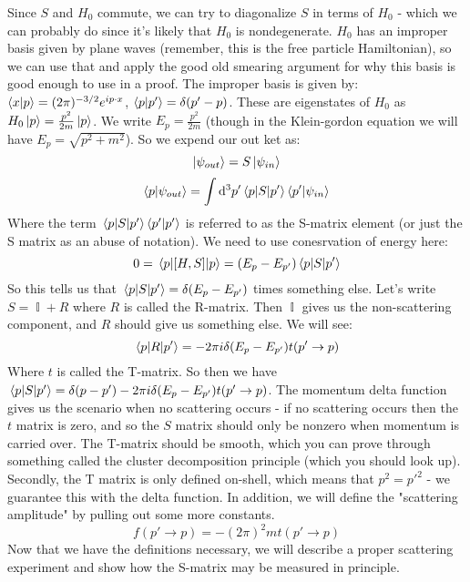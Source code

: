 \documentclass{article}
\DeclareMathOperator{\II}{\mathbb{I}}
\begin{document}
Since $S$ and $H_0$ commute, we can try to diagonalize $S$ in terms of $H_0$ - which we can probably do since it's likely that $H_0$ is nondegenerate. $H_0$ has an improper basis given by plane waves (remember, this is the free particle Hamiltonian), so we can use that and apply the good old smearing argument for why this basis is good enough to use in a proof. The improper basis is given by: $\braket{x}{p} = (2\pi)^{-3/2}e^{ip\cdot x}$, $\braket{p}{p'} = \delta(p'-p)$. These are eigenstates of $H_0$ as $H_0\ket{p}=\frac{p^2}{2m}\ket{p}$. We write $E_p = \frac{p^2}{2m}$ (though in the Klein-gordon equation we will have $E_p=\sqrt{p^2+m^2}$). So we expend our out ket as:
\[\ket{\psi_{out}} = S\ket{\psi_{in}}\]
\begin{equation}\label{scatter1}\braket{p}{\psi_{out}} = \int \dd^3 p' \mel{p}{S}{p'}\braket{p'}{\psi_{in}}\end{equation}
Where the term $ \mel{p}{S}{p'}\braket{p'}$ is referred to as the S-matrix element (or just the S matrix as an abuse of notation). We need to use conesrvation of energy here:
\[0 = \mel{p}{[H,S]}{p} = (E_{p}-E_{p'})\mel{p}{S}{p'}\]
So this tells us that $\mel{p}{S}{p'}=\delta(E_p-E_{p'})$ times something else. Let's write $S = \II + R$ where $R$ is called the R-matrix. Then $\II$ gives us the non-scattering component, and $R$ should give us something else. We will see:
\begin{equation}\label{scatter2}\mel{p}{R}{p'}=-2\pi i \delta(E_p-E_{p'})t(p' \to p)\end{equation}
Where $t$ is called the T-matrix. So then we have $\mel{p}{S}{p'}=\delta(p-p')-2\pi i \delta(E_p-E_{p'})t(p' \to p)$. The momentum delta function gives us the scenario when no scattering occurs - if no scattering occurs then the $t$ matrix is zero, and so the $S$ matrix should only be nonzero when momentum is carried over. The T-matrix should be smooth, which you can prove through something called the cluster decomposition principle (which you should look up). Secondly, the T matrix is only defined on-shell, which means that $p^2=p'^2$ - we guarantee this with the delta function. In addition, we will define the "scattering amplitude" by pulling out some more constants.
\begin{equation}\label{scatter3} f(p' \to p) = -(2\pi)^2 m t(p' \to p)\end{equation}
Now that we have the definitions necessary, we will describe a proper scattering experiment and show how the S-matrix may be measured in principle.
\pagebreak
\end{document}
